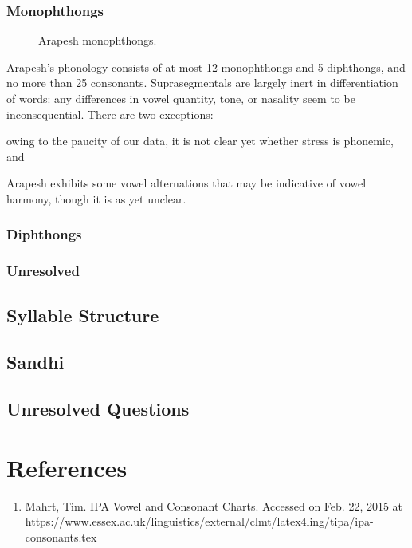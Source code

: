 \documentclass[pdftex,12pt,a4paper]{article}
\let\ipa\textipa
\begin{document}
\subsubsection{Monophthongs}

\begin{wrapfigure}{r}{.5\textwidth}
\begin{center}
{\large
\begin{vowel}
    \putcvowel{\ipa{1}}{9}
        \putcvowel{\ipa{@}}{12}
          \putcvowel{\ipa{5}}{15}
              \end{vowel}
}
\caption{Arapesh monophthongs.}
\end{center}
\end{wrapfigure}

Arapesh's phonology consists of at most 12 monophthongs and 5 diphthongs, and no more than 25 consonants. Suprasegmentals are largely inert in differentiation of words: any differences in vowel quantity, tone, or nasality seem to be inconsequential. There are two exceptions: \begin{inparaenum}[(a)] \item owing to the paucity of our data, it is not clear yet whether stress is phonemic, and \item Arapesh exhibits some vowel alternations that may be indicative of vowel harmony, though it is as yet unclear.\end{inparaenum}



\subsubsection{Diphthongs}

\subsubsection{Unresolved }

\subsection{Syllable Structure}

\subsection{Sandhi}

\subsection{Unresolved Questions}

\section*{References}

\begin{enumerate}

\item Mahrt, Tim. IPA Vowel and Consonant Charts. Accessed on Feb. 22, 2015 at https://www.essex.ac.uk/linguistics/external/clmt/latex4ling/tipa/ipa-consonants.tex


\end{enumerate}
\end{document}
